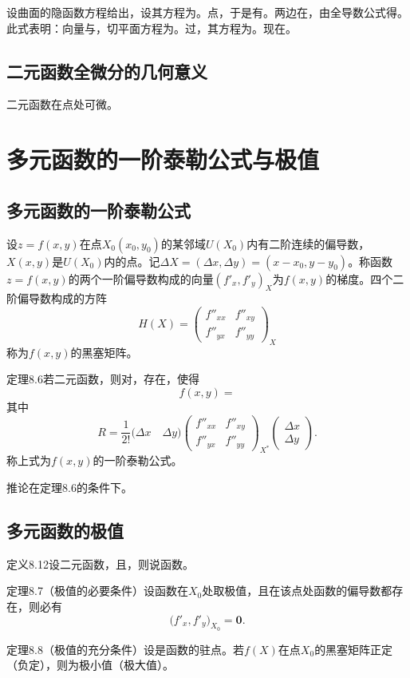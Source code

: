 设曲面的隐函数方程给出，设其方程为。点，于是有。两边在，由全导数公式得。此式表明：向量与，切平面方程为。过，其方程为。现在。

\subsection{二元函数全微分的几何意义}

二元函数在点处可微。

\section{多元函数的一阶泰勒公式与极值}
\subsection{多元函数的一阶泰勒公式}

设$z=f(x,y)$在点$X_0(x_0,y_0)$的某邻域$U(X_0)$内有二阶连续的偏导数，$X(x,y)$是$U(X_0)$内的点。记$\Delta X=(\Delta x,\Delta y)=(x-x_0,y-y_0)$。称函数$z=f(x,y)$的两个一阶偏导数构成的向量$(f'_x,f'_y)_X$为$f(x,y)$的梯度。四个二阶偏导数构成的方阵
\[
H(X)=
\begin{pmatrix}
f''_{xx} & f''_{xy}\\
f''_{yx} & f''_{yy}
\end{pmatrix}_X
\]
称为$f(x,y)$的黑塞矩阵。

定理8.6\quad 若二元函数，则对，存在，使得
\[
f(x,y)=
\]
其中
\[
R=\frac1{2!}\bigl(\Delta x\quad \Delta y\bigr)
\begin{pmatrix}
f''_{xx} & f''_{xy}\\
f''_{yx} & f''_{yy}
\end{pmatrix}_{X^*}
\begin{pmatrix}
\Delta x\\
\Delta y
\end{pmatrix}.
\]
称上式为$f(x,y)$的一阶泰勒公式。

\noindent 推论\quad 在定理8.6的条件下。

\subsection{多元函数的极值}

定义8.12\quad 设二元函数，且，则说函数。

定理8.7（极值的必要条件）\quad 设函数在$X_0$处取极值，且在该点处函数的偏导数都存在，则必有
\[
\bigl(f'_x,f'_y\bigr)_{X_0}=\boldsymbol{0}.
\]

定理8.8（极值的充分条件）\quad 设是函数的驻点。若$f(X)$在点$X_0$的黑塞矩阵正定（负定），则为极小值（极大值）。

